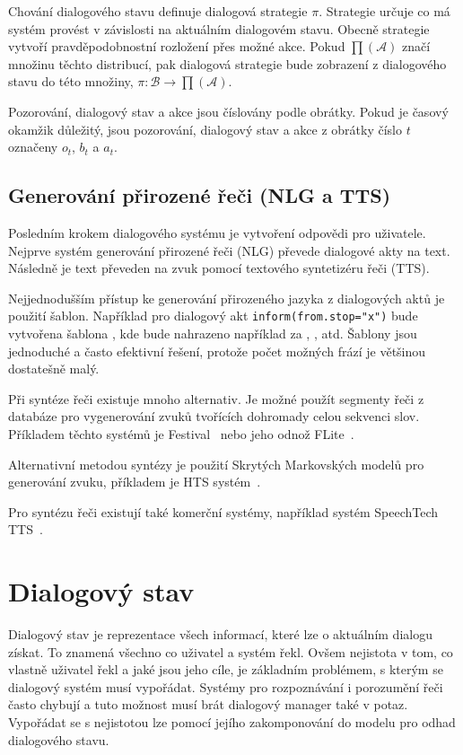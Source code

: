 Chování dialogového stavu definuje dialogová strategie $\pi$.
Strategie určuje co má systém provést v závislosti na aktuálním dialogovém stavu.
Obecně strategie vytvoří pravděpodobnostní rozložení přes možné akce.
Pokud $\prod(\mathcal{A})$ značí množinu těchto distribucí, pak dialogová strategie bude zobrazení z dialogového stavu do této množiny, $\pi: \mathcal{B} \longrightarrow \prod(\mathcal{A})$.

Pozorování, dialogový stav a akce jsou číslovány podle obrátky.
Pokud je časový okamžik důležitý, jsou pozorování, dialogový stav a akce z obrátky číslo $t$ označeny $o_t$, $b_t$ a $a_t$.

\subsection{Generování přirozené řeči (NLG a TTS)}

Posledním krokem dialogového systému je vytvoření odpovědi pro uživatele.
Nejprve systém generování přirozené řeči (NLG) převede dialogové akty na text.
Následně je text převeden na zvuk pomocí textového syntetizéru řeči (TTS).

Nejjednodušším přístup ke generování přirozeného jazyka z dialogových aktů je použití šablon.
Například pro dialogový akt {\tt inform(from.stop="x")} bude vytvořena šablona , kde  bude nahrazeno například za , , atd.
Šablony jsou jednoduché a často efektivní řešení, protože počet možných frází je většinou dostatešně malý.

Při syntéze řeči existuje mnoho alternativ.
Je možné použít segmenty řeči z databáze pro vygenerování zvuků tvořících dohromady celou sekvenci slov.
Příkladem těchto systémů je Festival~\cite{black2001festival} nebo jeho odnož  FLite~\cite{black2001flite}.

Alternativní metodou syntézy je použití Skrytých Markovských modelů pro generování zvuku, příkladem je HTS systém~\cite{zen2007hmm}.

Pro syntézu řeči existují také komerční systémy, například systém SpeechTech TTS~\cite{speechtech}.

\section{Dialogový stav}

Dialogový stav je reprezentace všech informací, které lze o aktuálním dialogu získat.
To znamená všechno co uživatel a systém řekl.
Ovšem nejistota v tom, co vlastně uživatel řekl a jaké jsou jeho cíle, je základním problémem, s kterým se dialogový systém musí vypořádat.
Systémy pro rozpoznávání i porozumění řeči často chybují a tuto možnost musí brát dialogový manager také v potaz.
Vypořádat se s nejistotou lze pomocí jejího zakomponování do modelu pro odhad dialogového stavu.

